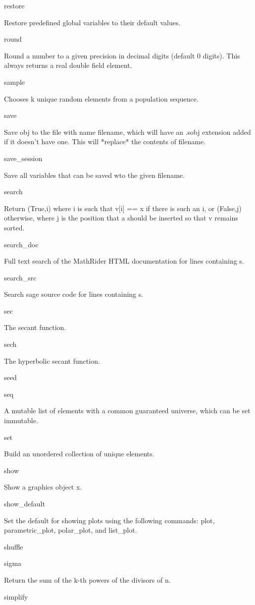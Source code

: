 \documentclass[12pt,oneside]{book}
\begin{document}
restore

Restore predefined global variables to their default values.

round

Round a number to a given precision in decimal digits (default 0 digits). This always returns a real double field element.

sample

Chooses k unique random elements from a population sequence.

save

Save obj to the file with name filename, which will have an .sobj extension added if it doesn't have one. This will *replace* the contents of filename.

save\_session

Save all variables that can be saved wto the given filename.

search

Return (True,i) where i is such that v[i] == x if there is such an i, or (False,j) otherwise, where j is the position that a should be inserted so that v remains sorted.

search\_doc

Full text search of the MathRider HTML documentation for lines containing s.

search\_src

Search sage source code for lines containing s.

sec

The secant function.

sech

The hyperbolic secant function.

seed


seq

A mutable list of elements with a common guaranteed universe, which can be set immutable.

set

Build an unordered collection of unique elements.

show

Show a graphics object x.

show\_default

Set the default for showing plots using the following commands: plot, parametric\_plot, polar\_plot, and list\_plot.

shuffle


sigma

Return the sum of the k{}-th powers of the divisors of n.

simplify
\end{document}
